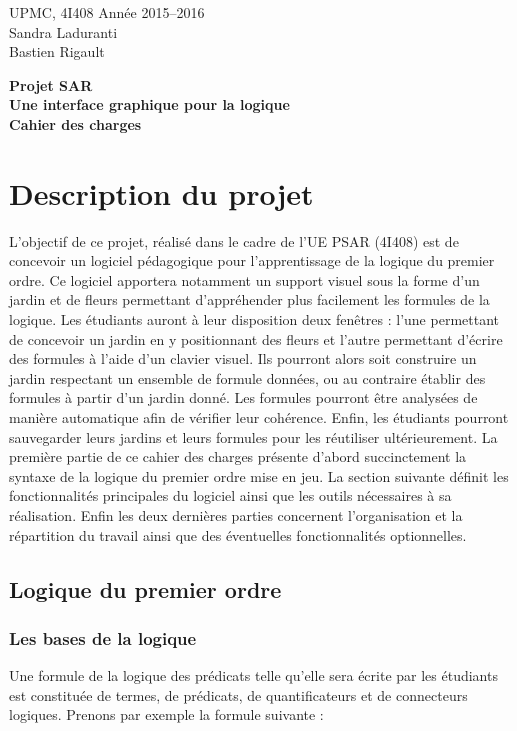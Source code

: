\documentclass{article}
\theoremstyle{plain}
\theoremstyle{remark}
\begin{document}
\noindent UPMC, 4I408 \hfill Année 2015--2016 \\
\hfill Sandra Laduranti \\ Bastien Rigault

\begin{center}
	\vspace{4cm}
 	{ \LARGE \bf
 	Projet SAR \\  Une interface graphique pour la logique 
	\\ \vspace{1cm}
 	Cahier des charges
 	}
\end{center}
\clearpage

\section{Description du projet}
L'objectif de ce projet, réalisé dans le cadre de l'UE PSAR (4I408)
est de concevoir un logiciel pédagogique pour l'apprentissage de la
logique du premier ordre. Ce logiciel apportera notamment un support
visuel sous la forme d'un jardin et de fleurs permettant d'appréhender
plus facilement les formules de la logique. Les étudiants auront à
leur disposition deux fenêtres : l'une permettant de concevoir un
jardin en y positionnant des fleurs et l'autre permettant d'écrire des
formules à l'aide d'un clavier visuel. Ils pourront alors soit
construire un jardin respectant un ensemble de formule données, ou au
contraire établir des formules à partir d'un jardin donné. Les
formules pourront être analysées de manière automatique afin de
vérifier leur cohérence. Enfin, les étudiants pourront sauvegarder
leurs jardins et leurs formules pour les réutiliser ultérieurement.
\newline La première partie de ce cahier des charges présente d'abord
succinctement la syntaxe de la logique du premier ordre mise en
jeu. La section suivante définit les fonctionnalités principales du
logiciel ainsi que les outils nécessaires à sa réalisation. Enfin les
deux dernières parties concernent l'organisation et la répartition du
travail ainsi que des éventuelles fonctionnalités optionnelles.

\subsection{Logique du premier ordre}
\subsubsection{Les bases de la logique}
Une formule de la logique des prédicats telle qu'elle sera écrite par
les étudiants est constituée de termes, de prédicats, de
quantificateurs et de connecteurs logiques. Prenons par exemple la
formule suivante :
\end{document}
